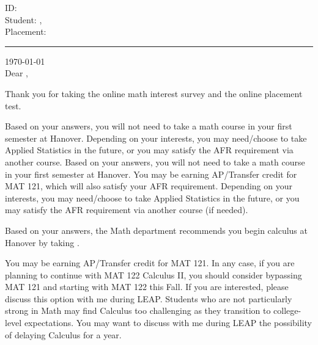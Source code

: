 \documentclass[12pt]{article}
\begin{document}
	\newpage
	{\noindent\Large ID: \\
	Student: ,  \\
	Placement: 
	}
	\vspace{0.2in}
	\hrule
	\vspace{0.6in}
	\noindent\today\\
  
	\vspace{0.2in}
	\noindent Dear ,
	\vspace{0.2in}

		Thank you for taking the online math interest survey and the online placement test.

		    Based on your answers, you will not need to take a math course in your first semester at Hanover. Depending on your interests, you may need/choose to take Applied Statistics in the future, or you may satisfy the AFR requirement via another course. 
		    Based on your answers, you will not need to take a math course in your first semester at Hanover. You may be earning AP/Transfer credit for MAT 121, which will also satisfy your AFR requirement. Depending on your interests, you may need/choose to take Applied Statistics in the future, or you may satisfy the AFR requirement via another course (if needed).
	  
	  
      Based on your answers, the Math department recommends you begin calculus at Hanover by taking .


      You may be earning AP/Transfer credit for MAT 121. In any case, if you are planning to continue with MAT 122 Calculus II, you should consider bypassing MAT 121 and starting with MAT 122 this Fall. If you are interested, please discuss this option with me during LEAP.
      		Students who are not particularly strong in Math may find Calculus too challenging as they transition to college-level expectations. You may want to discuss with me during LEAP the possibility of delaying Calculus for a year.
\end{document}
